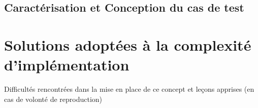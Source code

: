 \documentclass[french, a4paper, 11pt, twoside, pdftex]{StyleThese}
\begin{document}
    	\subsection{Caractérisation et Conception du cas de test}
    	

    \section{Solutions adoptées à la complexité d'implémentation}
        Difficultés rencontrées dans la mise en place de ce concept et leçons apprises (en cas de volonté de reproduction)

\ifdefined{}
\else


\end{document}
